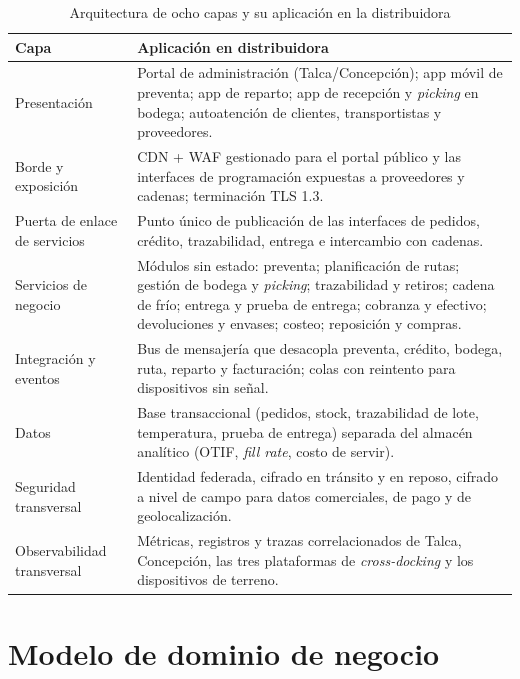 \begin{table}[htbp]
\centering
\small
\caption{Arquitectura de ocho capas y su aplicación en la distribuidora}
\label{tab:capas}
\begin{tabularx}{\textwidth}{@{}L{4.2cm}X@{}}
\toprule
\textbf{Capa} & \textbf{Aplicación en distribuidora} \\
\midrule
Presentación &
Portal de administración (Talca/Concepción); app móvil de preventa; app de reparto;
app de recepción y \emph{picking} en bodega; autoatención de clientes, transportistas
y proveedores. \\
\addlinespace
Borde y exposición &
CDN + WAF gestionado para el portal público y las interfaces de programación expuestas
a proveedores y cadenas; terminación TLS 1.3. \\
\addlinespace
Puerta de enlace de servicios &
Punto único de publicación de las interfaces de pedidos, crédito, trazabilidad, entrega
e intercambio con cadenas. \\
\addlinespace
Servicios de negocio &
Módulos sin estado: preventa; planificación de rutas; gestión de bodega y \emph{picking};
trazabilidad y retiros; cadena de frío; entrega y prueba de entrega; cobranza y efectivo;
devoluciones y envases; costeo; reposición y compras. \\
\addlinespace
Integración y eventos &
Bus de mensajería que desacopla preventa, crédito, bodega, ruta, reparto y facturación;
colas con reintento para dispositivos sin señal. \\
\addlinespace
Datos &
Base transaccional (pedidos, stock, trazabilidad de lote, temperatura, prueba de entrega)
separada del almacén analítico (OTIF, \emph{fill rate}, costo de servir). \\
\addlinespace
Seguridad transversal &
Identidad federada, cifrado en tránsito y en reposo, cifrado a nivel de campo para datos
comerciales, de pago y de geolocalización. \\
\addlinespace
Observabilidad transversal &
Métricas, registros y trazas correlacionados de Talca, Concepción, las tres plataformas
de \emph{cross-docking} y los dispositivos de terreno. \\
\bottomrule
\end{tabularx}
\end{table}

\section{Modelo de dominio de negocio}

